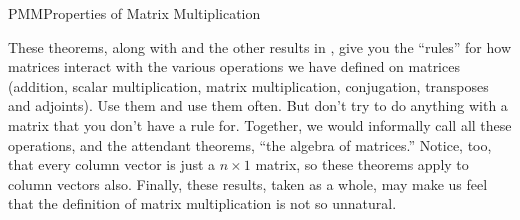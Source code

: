 \begin{subsect}{PMM}{Properties of Matrix Multiplication}
%
\begin{para}These theorems, along with  and the other results in , give you the ``rules'' for how matrices interact with the various operations we have defined on matrices (addition, scalar multiplication, matrix multiplication, conjugation, transposes and adjoints).  Use them and use them often.  But don't try to do anything with a matrix that you don't have a rule for.  Together, we would informally call all these operations, and the attendant theorems, ``the algebra of matrices.''  Notice, too, that every column vector is just a $n\times 1$ matrix, so these theorems apply to column vectors also.  Finally, these results, taken as a whole, may make us feel that the definition of matrix multiplication is not so unnatural.\end{para}
%
%
\end{subsect}
%
